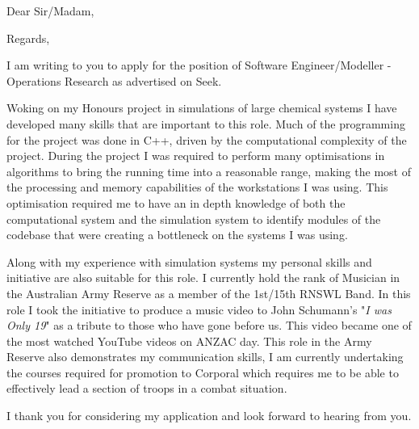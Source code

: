 


\recipient{~}{~}
\date{\today}
\opening{Dear Sir/Madam,}
\closing{Regards,}



\makelettertitle

I am writing to you to apply for the position of Software Engineer/Modeller - Operations Research as advertised on Seek.

Woking on my Honours project in simulations of large chemical systems I have developed many skills that are important to this role. Much of the programming for the project was done in C++, driven by the computational complexity of the project. During the project I was required to perform many optimisations in algorithms to bring the running time into a reasonable range, making the most of the processing and memory capabilities of the workstations I was using. This optimisation required me to have an in depth knowledge of both the computational system and the simulation system to identify modules of the codebase that were creating a bottleneck on the systems I was using.

Along with my experience with simulation systems my personal skills and initiative are also suitable for this role. I currently hold the rank of Musician in the Australian Army Reserve as a member of the 1st/15th RNSWL Band. In this role I took the initiative to produce a music video to John Schumann's "\emph{I was Only 19}" as a tribute to those who have gone before us. This video became one of the most watched YouTube videos on ANZAC day. This role in the Army Reserve also demonstrates my communication skills, I am currently undertaking the courses required for promotion to Corporal which requires me to be able to effectively lead a section of troops in a combat situation.

I thank you for considering my application and look forward to hearing from you.

\makeletterclosing


